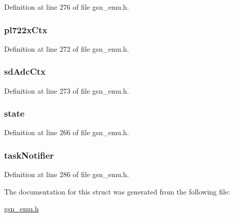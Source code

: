 Definition at line 276 of file gsn\_\-emu.h.

\hypertarget{a00059_a3b1676d377e919c2a6e4e2de63885f5a}{
\subsubsection[{pl722xCtx}]{ {\bf pl722xCtx}}}
\label{a00059_a3b1676d377e919c2a6e4e2de63885f5a}


Definition at line 272 of file gsn\_\-emu.h.

\hypertarget{a00059_a1ecea336f1ec46a2bc1fe898b676a533}{
\subsubsection[{sdAdcCtx}]{ {\bf sdAdcCtx}}}
\label{a00059_a1ecea336f1ec46a2bc1fe898b676a533}


Definition at line 273 of file gsn\_\-emu.h.

\hypertarget{a00059_a8e4e413d6cdd8ed5d0b00352c705e870}{
\subsubsection[{state}]{ {\bf state}}}
\label{a00059_a8e4e413d6cdd8ed5d0b00352c705e870}


Definition at line 266 of file gsn\_\-emu.h.

\hypertarget{a00059_a36ee45c72f5016b9cadd6800fe182bb8}{
\subsubsection[{taskNotifier}]{ {\bf taskNotifier}}}
\label{a00059_a36ee45c72f5016b9cadd6800fe182bb8}


Definition at line 286 of file gsn\_\-emu.h.



The documentation for this struct was generated from the following file:\begin{DoxyCompactItemize}
\item 
\hyperlink{a00489}{gsn\_\-emu.h}\end{DoxyCompactItemize}
